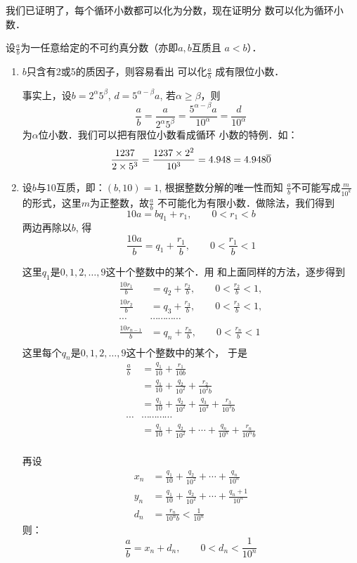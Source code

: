 我们已证明了，每个循环小数都可以化为分数，现在证明分
数可以化为循环小数．

设$\frac{a}{b}$为一任意给定的不可约真分数（亦即$a,b$互质且
$a<b$）．
\begin{enumerate}
    \item $b$只含有2或5的质因子，则容易看出
可以化$\frac{a}{b}$
成有限位小数．

事实上，设$b=2^{\alpha}5^{\beta}$, $d=5^{\alpha-\beta}a$, 若$\alpha\ge \beta$，则
$$\frac{a}{b}=\frac{a}{2^{\alpha}5^{\beta}}=\frac{5^{\alpha-\beta}a}{10^{\alpha}}=\frac{d}{10^{\alpha}}$$
为$\alpha$位小数．我们可以把有限位小数看成循环
小数的特例．如：
\[\dfrac{1237}{2\times 5^3}=\dfrac{1237\times 2^2}{10^3}=4.948=4.948\overline{0}\]

\item 设$b$与10互质，即：$(b,10)=1$, 根据整数分解的唯一性而知
$\frac{a}{b}$不可能写成$\frac{m}{10^k}$
的形式，这里$m$为正整数，故$\frac{a}{b}$
不可能化为有限小数．做除法，我们得到
\[10a=bq_1+r_1,\qquad 0<r_1<b\]
两边再除以$b$, 得
\[\frac{10a}{b}=q_1+\frac{r_1}{b},\qquad 0<\frac{r_1}{b}<1\]

这里$q_1$是$0,1,2,\ldots,9$这十个整数中的某个．用
和上面同样的方法，逐步得到
\[\begin{split}
    \frac{10r_1}{b}&=q_2+\frac{r_2}{b},\qquad 0<\frac{r_2}{b}<1,\\
    \frac{10r_2}{b}&=q_3+\frac{r_3}{b},\qquad 0<\frac{r_3}{b}<1,\\
\cdots &\cdots \cdots \cdots \cdots \\
    \frac{10r_{n-1}}{b}&=q_n+\frac{r_n}{b},\qquad 0<\frac{r_n}{b}<1\\
\end{split}\]
这里每个$q_n$是$0,1,2,\ldots,9$这十个整数中的某个，
于是
\[\begin{split}
    \frac{a}{b}&=\frac{q_1}{10}+\frac{r_1}{10b}\\
    &=\frac{q_1}{10}+\frac{q_2}{10^2}+\frac{r_2}{10^2b}\\
    &=\frac{q_1}{10}+\frac{q_2}{10^2}+\frac{q_3}{10^3}+\frac{r_3}{10^3b}\\
    \cdots &\cdots \cdots \cdots \cdots \\
    &=\frac{q_1}{10}+\frac{q_2}{10^2}+\cdots+\frac{q_n}{10^n}+\frac{r_n}{10^n b}\\
\end{split}\]

再设
\[\begin{split}
    x_n&=\frac{q_1}{10}+\frac{q_2}{10^2}+\cdots+\frac{q_n}{10^n}\\
    y_n&=\frac{q_1}{10}+\frac{q_2}{10^2}+\cdots+\frac{q_n+1}{10^n}\\
    d_n&=\frac{r_n}{10^n b}<\frac{1}{10^n}
\end{split}\]
则：
\[\frac{a}{b}=x_n+d_n,\qquad 0<d_n<\frac{1}{10^n}\]


\end{enumerate}
